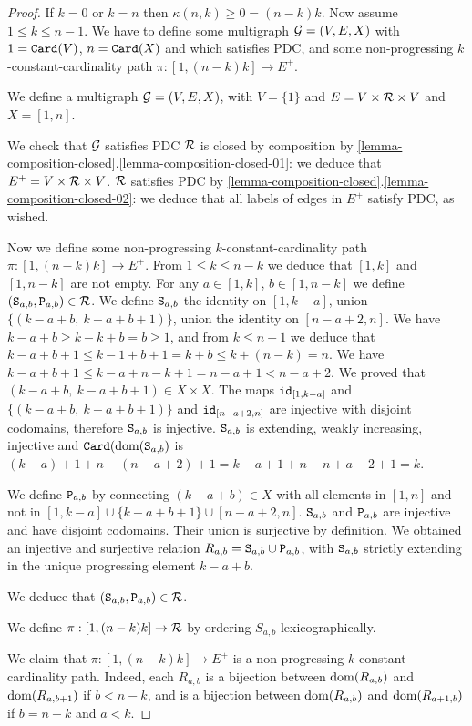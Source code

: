 \documentclass{lmcs}
\begin{document}
\begin{proof}
If $k=0$ or $k=n$ then $\kappa(n,k) \ge 0 = (n-k)k$. Now assume $1 \le k \le n-1$. 
We have to define some multigraph ${\mathcal G}=(V,E,X)$ with $1 = {\tt Card}(V)$, $n={\tt Card}(X)$
and which satisfies PDC,
and some non-progressing $k$-constant-cardinality path $\pi : [1,(n-k)k] \rightarrow E^+$.


We define a multigraph ${\mathcal G}=(V,E,X)$, with $V=\{1\}$ and 
$E = V \times {\mathcal R} \times V$ and $X = [1,n]$. 

We check that ${\mathcal G}$ satisfies PDC
${\mathcal R}$ is closed by composition 
by \ref{lemma-composition-closed}.\ref{lemma-composition-closed-01}:
we deduce that $E^+ = V \times {\mathcal R} \times V$. 
${\mathcal R}$ satisfies PDC by
\ref{lemma-composition-closed}.\ref{lemma-composition-closed-02}: 
we deduce that all labels of edges in $E^+$ satisfy PDC, as wished.

Now we define some non-progressing $k$-constant-cardinality path 
$\pi:[1,(n-k)k] \rightarrow E^+$.  From $1 \le k \le n-k$ we deduce
that $[1,k]$ and $[1,n-k]$ are not empty. For any $a \in [1,k]$, $b \in [1,n-k]$
we define $({\tt S}_{a,b},{\tt P}_{a,b}) \in {\mathcal R}$. We define ${\tt S}_{a,b}$ the identity on 
$[1,k-a] $, union $\{(k-a+b, \ k-a+b+1)\}$, union the identity on $[n-a+2,n]$. 
We have $k-a+b \ge k - k + b = b \ge 1$, and from $k \le n-1$
we deduce that $k-a+b+1 \le k - 1 + b  +1 = k + b \le k + (n-k) = n$.
We have $k-a+b+1 \le k - a + n - k +1 = n - a +1 < n-a+2$.
We proved that $(k-a+b, \ k-a+b+1) \in X \times X$. The maps
${\tt id}_{[1,k-a]}$ and $\{(k-a+b, \ k-a+b+1)\}$ and ${\tt id}_{[n-a+2,n]}$ are injective
with disjoint codomains, therefore ${\tt S}_{a,b}$ is injective. 
${\tt S}_{a,b}$ is extending, weakly increasing, injective and ${\tt Card}({\rm dom}({\tt S}_{a,b})$
is $(k-a) +1 + n-(n-a+2)+1 = k-a+1+n-n+a-2+1= k$.

We define ${\tt P}_{a,b}$ by connecting
$(k-a+b) \in X$ with all elements in $[1,n]$ and not in 
$[1,k-a] \cup \{k-a+b+1\} \cup [n-a+2,n]$. ${\tt S}_{a,b}$ and ${\tt P}_{a,b}$ are injective
and have disjoint codomains. Their union is surjective by definition.
We obtained an injective and surjective relation $R_{a,b} = {\tt S}_{a,b} \cup {\tt P}_{a,b}$,
with ${\tt S}_{a,b}$ strictly extending in the unique progressing element $k-a+b$. 


We deduce that $({\tt S}_{a,b},{\tt P}_{a,b}) \in {\mathcal R}$. 

We define $\pi:[1,(n-k)k] 
\rightarrow {\mathcal R}$ by ordering $S_{a,b}$ lexicographically.

We claim that
$\pi:[1,(n-k)k] \rightarrow E^+$ is a non-progressing $k$-constant-cardinality path.
Indeed, each $R_{a,b}$ is a bijection between ${\rm dom}(R_{a,b})$ and 
${\rm dom}(R_{a,b+1})$ if $b<n-k$, and is a bijection between ${\rm dom}(R_{a,b})$ and 
${\rm dom}(R_{a+1,b})$ if $b=n-k$ and $a<k$.
\end{proof}
\end{document}
